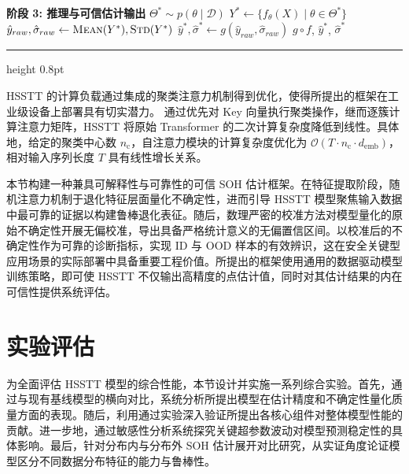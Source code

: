 \begin{algorithmic}[1]
    \Statex \textbf{阶段 3: 推理与可信估计输出}
    \State $\Theta^{*} \sim p(\theta \mid \mathcal{D})$ 
    \State $Y^{*} \leftarrow \{f_{\theta}(X) \mid \theta \in \Theta^{*}\}$ 
    \State $\hat{y}_{raw}, \hat{\sigma}_{raw} \leftarrow \textsc{Mean}(Y^{*}), \textsc{Std}(Y^{*})$ 
    \State $\hat{y}^{*}, \hat{\sigma}^{*} \leftarrow g(\hat{y}_{raw}, \hat{\sigma}_{raw})$ 
    \State \Return $g \circ f$, $\hat{y}^{*}$, $\hat{\sigma}^{*}$
\end{algorithmic}
\endgroup
\vspace{3pt}
\hrule height 0.8pt
\vspace{1em}


HSSTT 的计算负载通过集成的聚类注意力机制得到优化，使得所提出的框架在工业级设备上部署具有切实潜力。
% 
通过优先对 Key 向量执行聚类操作，继而逐簇计算注意力矩阵，HSSTT 将原始 Transformer 的二次计算复杂度降低到线性。具体地，给定的聚类中心数 $n_{\text{c}}$，自注意力模块的计算复杂度优化为 $\mathcal{O}(T \cdot n_{\text{c}} \cdot d_{\text{emb}})$，相对输入序列长度 $T$ 具有线性增长关系。

本节构建一种兼具可解释性与可靠性的可信 SOH 估计框架。在特征提取阶段，随机注意力机制于退化特征层面量化不确定性，进而引导 HSSTT 模型聚焦输入数据中最可靠的证据以构建鲁棒退化表征。随后，数理严密的校准方法对模型量化的原始不确定性开展无偏校准，导出具备严格统计意义的无偏置信区间。以校准后的不确定性作为可靠的诊断指标，实现 ID 与 OOD 样本的有效辨识，这在安全关键型应用场景的实际部署中具备重要工程价值。所提出的框架使用通用的数据驱动模型训练策略，即可使 HSSTT 不仅输出高精度的点估计值，同时对其估计结果的内在可信性提供系统评估。

\section{实验评估}\label{sec:HSSTT_experiment}

为全面评估 HSSTT 模型的综合性能，本节设计并实施一系列综合实验。首先，通过与现有基线模型的横向对比，系统分析所提出模型在估计精度和不确定性量化质量方面的表现。随后，利用通过实验深入验证所提出各核心组件对整体模型性能的贡献。进一步地，通过敏感性分析系统探究关键超参数波动对模型预测稳定性的具体影响。最后，针对分布内与分布外 SOH 估计展开对比研究，从实证角度论证模型区分不同数据分布特征的能力与鲁棒性。

